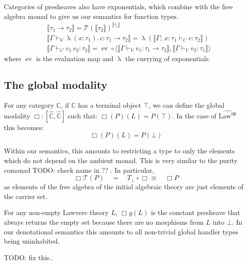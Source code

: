 \documentclass[acmsmall, screen, nonacm]{acmart}
\theoremstyle{definition}
\newcommand{\glob}{\mathop{\Box}}
\newcommand{\cat}{\mathbb{C}}
\newcommand{\psh}{\widehat{\cat}}
\newcommand{\terminal}{\top}
\newcommand{\initial}{\bot}
\newcommand{\lawc}{\mathrm{Law}}
\newcommand{\lawcop}{\lawc^{\mathtt{op}}}
\newcommand{\pshlawcop}{\widehat{\lawcop}}
\newcommand{\yoneda}[1]{y(#1)}
\newcommand{\arrow}[2]{{#2}^{#1}}
\newcommand{\sem}[1]{\llbracket #1 \rrbracket}
\newcommand{\mon}{\mathcal{T}}
\newcommand{\abs}[3]{\mathop{\lambda}(#1 \types #2).\,#3}
\newcommand{\app}[2]{#1\,#2}
\newcommand{\types}{\mathrel{:}}
\newcommand{\ccons}[2]{#1;\,#2}
\newcommand{\lbind}[3]{\ccons{#1}{#2\types#3}}
\newcommand{\turnv}{\mathrel{\vdash_V}}
\newcommand{\turnc}{\mathrel{\vdash_C}}
\newcommand{\evmap}{\mathop{ev}}
\newcommand{\currymap}{\mathop{\lambda}}
\newcommand{\todo}[1]{{\color{red}TODO: #1}}
\begin{document}
Categories of presheaves also have exponentials, which combine with the
free algebra monad to give us our semantics for function types.
\begin{align*}
  &\sem{\tau_1 \rightarrow \tau_2} = \arrow{\sem{\tau_1}}{\mon(\sem{\tau_2})} \\
  &\sem{\Gamma \turnv \abs{x}{\tau_1}{c} \types \tau_1 \rightarrow \tau_2} =
    \currymap(\sem{\lbind{\Gamma}{x}{\tau_1} \turnc c \types \tau_2})
     \\
  &\sem{\Gamma \turnc \app{v_1}{v_2} \types \tau_2} =
    \evmap
    \circ \langle \sem{\Gamma \turnv v_1 \types \tau_1 \rightarrow \tau_2},
                  \sem{\Gamma \turnv v_2 \types \tau_1} \rangle
\end{align*}
where $\evmap$ is the evaluation map and $\currymap$ the currying of
exponentials.

\subsection{The global modality}

For any category $\cat$, if $\cat$ has a terminal object $\terminal$, we
can define the global modality $\glob \types [\psh, \psh]$ such that:
$\glob(P)(L) = P(\terminal)$. In the case of $\pshlawcop$ this becomes:
\begin{equation*}
\glob(P)(L) = P(\initial)
\end{equation*}

Within our semantics, this amounts to restricting a type to only the
elements which do not depend on the ambient monad. This is very similar
to the purity comonad \todo{check name} in ?? \cite{??}. In particular,
\begin{equation*}
  \glob \mon(P) \quad = \quad T_{\initial} \circ \glob
  \cong \quad \glob P
\end{equation*}
as elements of the free algebra of the initial algebraic theory are just
elements of the carrier set.

For any non-empty Lawvere theory $L$, $\glob \yoneda{L}$ is the constant
presheave that always returns the empty set because there are no
morphisms from $L$ into $\initial$. In our denotational semantics this
amounts to all non-trivial global handler types being uninhabited.

\todo{fix this..}
\end{document}
